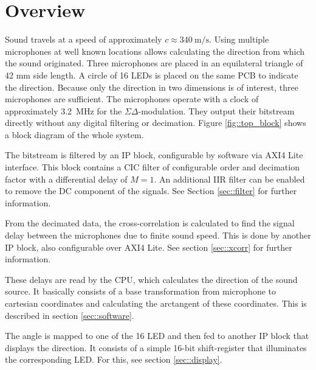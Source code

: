 \section{Overview}
Sound travels at a speed of approximately $c\approx \SI{340}{\meter\per\s}$.
Using multiple microphones at well known locations allows calculating the direction from which the sound originated.
Three microphones are placed in an equilateral triangle of 42 mm side length.
A circle of 16 LEDs is placed on the same PCB to indicate the direction.
Because only the direction in two dimensions is of interest, three microphones are sufficient.
The microphones operate with a clock of approximately \SI{3.2}{\mega\hertz} for the $\Sigma\Delta$-modulation.
They output their bitstream directly without any digital filtering or decimation.
Figure \ref{fig::top_block} shows a block diagram of the whole system.

The bitstream is filtered by an IP block, configurable by software via AXI4 Lite interface.
This block contains a CIC filter of configurable order and decimation factor with a differential delay of $M=1$.
An additional IIR filter can be enabled to remove the DC component of the signals.
See Section \ref{sec::filter} for further information.

From the decimated data, the cross-correlation is calculated to find the signal delay between the microphones due to finite sound speed.
This is done by another IP block, also configurable over AXI4 Lite.
See section \ref{sec::xcorr} for further information.

These delays are read by the CPU, which calculates the direction of the sound source. 
It basically consists of a base transformation from microphone to cartesian coordinates and calculating the arctangent of these coordinates.
This is described in section \ref{sec::software}.

The angle is mapped to one of the 16 LED and then fed to another IP block that displays the direction.
It consists of a simple 16-bit shift-register that illuminates the corresponding LED.
For this, see section \ref{sec::display}.

